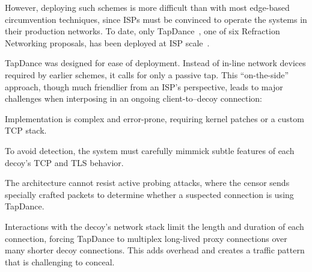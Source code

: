 \documentclass[letterpaper,twocolumn,10pt]{article}
\begin{document}
However, deploying such schemes is more difficult than with most
edge-based circumvention techniques, since ISPs must be convinced to
operate the systems in their production networks.  To date, only
TapDance~\cite{tapdance14}, one of six Refraction Networking
proposals, has been deployed at ISP scale~\cite{frolov2017isp}.

TapDance was designed for ease of deployment.
Instead of in-line network devices required by earlier schemes, it
calls for only a passive tap.
This ``on-the-side'' approach, though much friendlier from an ISP's
perspective, leads to major challenges when interposing in an ongoing
client-to--decoy connection:
\begin{compactitem}
\item Implementation is complex and error-prone, requiring kernel
  patches or a custom TCP stack.
\item To avoid detection, the system must carefully mimmick
  subtle features of each decoy's TCP and TLS behavior.
\item The architecture cannot resist active probing attacks, where the
  censor sends specially crafted packets to determine whether a
  suspected connection is using TapDance.
\item Interactions with the decoy's network stack limit the length and
  duration of each connection, forcing TapDance to multiplex
  long-lived proxy connections over many shorter decoy
  connections. This adds overhead and creates a traffic pattern
  that is challenging to conceal.
\end{compactitem}



\end{document}
